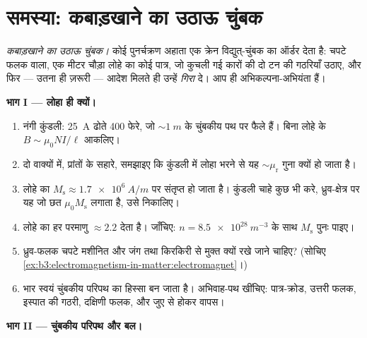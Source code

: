 \section{समस्या: कबाड़खाने का उठाऊ चुंबक}

\begin{problem}\label{pb:b3:electromagnetism-in-matter:1}
\emph{कबाड़खाने का उठाऊ चुंबक।} कोई पुनर्चक्रण अहाता एक क्रेन
विद्युत्-चुंबक का ऑर्डर देता है: चपटे फलक वाला, एक मीटर चौड़ा लोहे का
कोई पात्र, जो कुचली गई कारों की दो टन की गठरियाँ उठाए, और फिर ---
उतना ही ज़रूरी --- आदेश मिलते ही उन्हें \emph{गिरा} दे। आप ही
अभिकल्पना-अभियंता हैं।

\medskip\noindent\textbf{भाग I --- लोहा ही क्यों।}

\begin{enumerate}
  \item नंगी कुंडली: \qty{25}{A} ढोते 400 फेरे, जो
        $\sim\qty{1}{m}$ के चुंबकीय पथ पर फैले हैं। बिना लोहे के $B \sim
        \mu_0NI/\ell$ आकलिए।
  \item दो वाक्यों में, प्रांतों के सहारे, समझाइए कि कुंडली में
        लोहा भरने से यह $\sim\mu_{\text{r}}$ गुना क्यों हो जाता है।
  \item लोहे का  $M_{\text{s}} \approx
        \qty{1.7e6}{A/m}$ पर संतृप्त हो जाता है। कुंडली चाहे कुछ भी
        करे, ध्रुव-क्षेत्र पर यह जो छत $\mu_0M_{\text{s}}$ लगाता है,
        उसे निकालिए।
  \item लोहे का हर परमाणु $\approx 2.2$  देता है।
        जाँचिए: $n = \qty{8.5e28}{m^{-3}}$ के साथ
        $M_{\text{s}}$ पुनः पाइए।
  \item ध्रुव-फलक चपटे मशीनित और जंग तथा किरकिरी से मुक्त क्यों
        रखे जाने चाहिए? (सोचिए
        \cref{ex:b3:electromagnetism-in-matter:electromagnet}।)
  \item भार स्वयं चुंबकीय परिपथ का हिस्सा बन जाता है।
        अभिवाह-पथ खींचिए: पात्र-क्रोड, उत्तरी फलक, इस्पात की गठरी,
        दक्षिणी फलक, और जुए से होकर वापस।
\end{enumerate}

\medskip\noindent\textbf{भाग II --- चुंबकीय परिपथ और बल।}


\end{problem}
